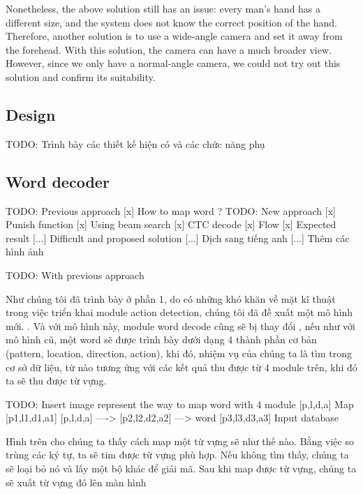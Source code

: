 Nonetheless, the above solution still has an issue: every man’s hand has a different size, and the system does not know the correct position of the hand. Therefore, another solution is to use a wide-angle camera and set it away from the forehead. With this solution, the camera can have a much broader view. However, since we only have a normal-angle camera, we could not try out this solution and confirm its suitability.

\subsection{ Design}
  TODO: Trình bày các thiết kế hiện có và các chức năng phụ

\subsection{Word decoder}
TODO:   Previous approach 
      [x] How to map word ?
TODO:   New approach
      [x] Punish function
      [x] Using beam search
      [x] CTC decode
      [x] Flow
      [x] Expected result
      [...] Difficult and proposed solution
      [...] Dịch sang tiếng anh
      [...] Thêm các hình ảnh


    TODO: With previous approach

    Như chúng tôi đã trình bày ở phần 1, do có những khó khăn 
    về mặt kĩ thuật trong việc triển khai module
    action detection, chúng tôi đã đề xuất một mô hình mới.
    . Và với mô hình này, module word decode cũng sẽ bị thay đổi
    , nếu như với mô hình cũ, một word sẽ được trình bày dưới dạng
    4 thành phần cơ bản (pattern, location, direction, action),
    khi đó, nhiệm vụ của chúng ta là tìm trong cơ sở dữ liệu, từ nào
    tương ứng với các kết quả thu được từ 4 module trên, khi đó
    ta sẽ thu được từ vựng.

    TODO: Insert image represent the way to map word with 4 module
                              [p,l,d,a]
                        Map   [p1,l1,d1,a1]
              [p,l,d,a] ----> [p2,l2,d2,a2] ---> word
                              [p3,l3,d3,a3]
              Input             database

    Hình trên cho chúng ta thấy cách map một từ vựng sẽ như thế nào.
    Bằng việc so trùng các ký tự, ta sẽ tim được từ vựng phù hợp.
    Nếu không tìm thấy, chúng ta sẽ loại bỏ nó và lấy một bộ khác
    để giải mã.
    Sau khi map được từ vựng, chúng ta sẽ xuất từ vựng đó lên màn hình

